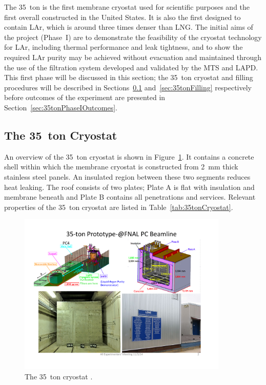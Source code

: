 The 35~ton is the first membrane cryostat used for scientific purposes and the first overall constructed in the United States.  It is also the first designed to contain LAr, which is around three times denser than LNG.  The initial aims of the project (Phase~I) are to demonstrate the feasibility of the cryostat technology for LAr, including thermal performance and leak tightness, and to show the required LAr purity may be achieved without evacuation and maintained through the use of the filtration system developed and validated by the MTS and LAPD.  This first phase will be discussed in this section; the 35~ton cryostat and filling procedures will be described in Sections~\ref{sec:35tonCryostat} and~\ref{sec:35tonFilling} respectively before outcomes of the experiment are presented in Section~\ref{sec:35tonPhaseIOutcomes}.

\subsection{The 35~ton Cryostat}\label{sec:35tonCryostat}

An overview of the 35~ton cryostat is shown in Figure~\ref{fig:35tonCryostat}.  It contains a concrete shell within which the membrane cryostat is constructed from 2~mm thick stainless steel panels.  An insulated region between these two segments reduces heat leaking.  The roof consists of two plates; Plate A is flat with insulation and membrane beneath and Plate B contains all penetrations and services.  Relevant properties of the 35~ton cryostat are listed in Table~\ref{tab:35tonCryostat}.

\begin{figure}
  \centering
  \includegraphics[width=10cm]{35tonCryostat.pdf}
  \caption[The 35~ton cryostat.]{The 35~ton cryostat \cite{35tonPhaseI2015}.}
  \label{fig:35tonCryostat}
\end{figure}

